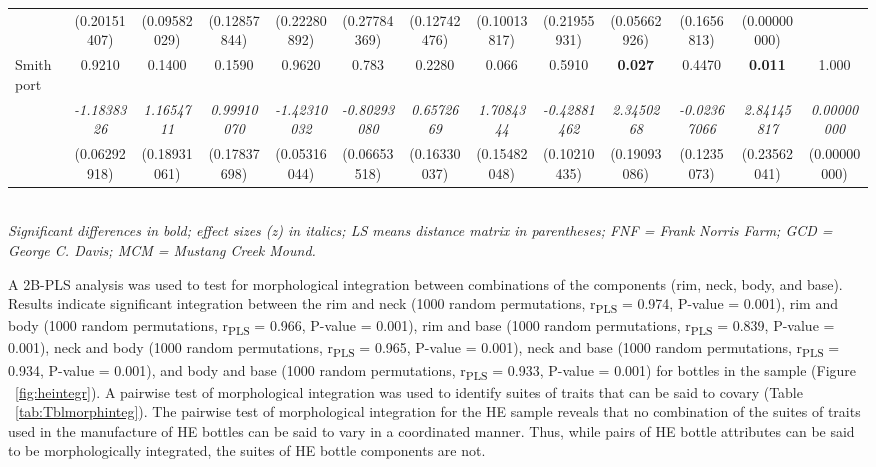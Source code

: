 \documentclass[review]{elsarticle}
\begin{document}
\begin{table}
\begin{tabular}{lcccccccccccc}
 & (0.20151407) & (0.09582029) & (0.12857844) & (0.22280892) & (0.27784369) & (0.12742476) & (0.10013817) & (0.21955931) & (0.05662926) & (0.1656813) & (0.00000000) & \\ 
Smithport & 0.9210 & 0.1400 & 0.1590 & 0.9620 & 0.783 & 0.2280 & 0.066 & 0.5910 & \textbf{0.027} & 0.4470 & \textbf{0.011 } & 1.000\\
 & \textit{-1.1838326} & \textit{1.1654711} & \textit{0.99910070} & \textit{-1.42310032} & \textit{-0.80293080} & \textit{0.6572669} & \textit{1.7084344} & \textit{-0.42881462} & \textit{2.3450268} & \textit{-0.02367066} & \textit{2.84145817} & \textit{0.00000000}\\
 & (0.06292918) & (0.18931061) & (0.17837698) & (0.05316044) & (0.06653518) & (0.16330037) & (0.15482048) & (0.10210435) & (0.19093086) & (0.1235073) & (0.23562041) & (0.00000000)\\
\bottomrule
\end{tabular}\\
\smallskip
\textit{Significant differences in bold; effect sizes (z) in italics; LS means distance matrix in parentheses; FNF = Frank Norris Farm; GCD = George C. Davis; MCM = Mustang Creek Mound.}
\label{tab:TblSITE}
\end{table}

A  2B-PLS analysis was used to test for morphological integration between combinations of the components (rim, neck, body, and base). Results indicate significant integration between the rim and neck (1000 random permutations, r\textsubscript{PLS} = 0.974, P-value = 0.001), rim and body (1000 random permutations, r\textsubscript{PLS} = 0.966, P-value = 0.001), rim and base (1000 random permutations, r\textsubscript{PLS} = 0.839, P-value = 0.001), neck and body (1000 random permutations, r\textsubscript{PLS} = 0.965, P-value = 0.001), neck and base (1000 random permutations, r\textsubscript{PLS} = 0.934, P-value = 0.001), and body and base (1000 random permutations, r\textsubscript{PLS} = 0.933, P-value = 0.001) for bottles in the sample (Figure ~\ref{fig:heintegr}). A pairwise test of morphological integration was used to identify suites of traits that can be said to covary (Table ~\ref{tab:Tblmorphinteg}). The pairwise test of morphological integration for the HE sample reveals that no combination of the suites of traits used in the manufacture of HE bottles can be said to vary in a coordinated manner. Thus, while pairs of HE bottle attributes can be said to be morphologically integrated, the suites of HE bottle components are not.
\end{document}
